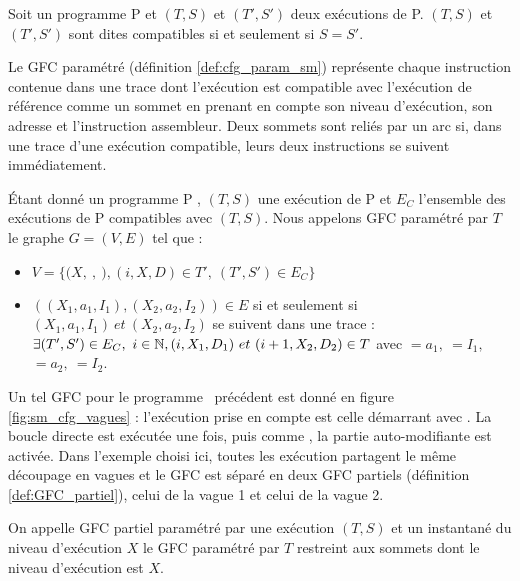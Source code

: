 \begin{defi}
 Soit un programme P et $(T, S)$ et $(T', S')$ deux exécutions de P.
 $(T, S)$ et $(T', S')$ sont dites compatibles si et seulement si $S=S'$.
\label{def:executions_compatibles}
\end{defi}

Le GFC paramétré (définition \ref{def:cfg_param_sm}) représente chaque instruction contenue dans une trace dont l'exécution est compatible avec l'exécution de référence comme un sommet en prenant en compte son niveau d'exécution, son adresse et l'instruction assembleur. Deux sommets sont reliés par un arc si, dans une trace d'une exécution compatible, leurs deux instructions se suivent immédiatement.

\begin{defi}
 Étant donné un programme P \sm, $(T, S)$ une exécution de P et $E_C$ l'ensemble des exécutions de P compatibles avec $(T, S)$.
 Nous appelons GFC paramétré par $T$ le graphe $G=(V, E)$ tel que :
 \begin{itemize}
  \item $V=\{(X,\ $$,\ $$), (i, X, D)\in T',\ (T', S')\in E_C \}$%
  \item $((X_1, a_1, I_1), (X_2, a_2, I_2))\in E$ si et seulement si $(X_1, a_1,
I_1)\ et\ (X_2, a_2, I_2)$ se suivent dans une trace : $\exists (T', S')\in
E_C,\ i\in \mathbb N, (i, X_1, D_1)\ et\ (i+1, X_2, D_2)\in T$ avec $=a_1,\ $$=I_1,$~$=a_2,\ $$=I_2$.
 \end{itemize}
\label{def:cfg_param_sm}
\end{defi}


Un tel GFC pour le programme \sm\ précédent est donné en figure \ref{fig:sm_cfg_vagues} : l'exécution prise en compte est celle démarrant avec . La boucle directe est exécutée une fois, puis comme , la partie auto-modifiante est activée. Dans l'exemple choisi ici, toutes les exécution partagent le même découpage en vagues et le GFC est séparé en deux GFC partiels (définition \ref{def:GFC_partiel}), celui de la vague 1 et celui de la vague 2.

\begin{defi}
 On appelle GFC partiel paramétré par une exécution $(T, S)$ et un instantané du niveau d'exécution $X$ le GFC paramétré par $T$ restreint aux sommets dont le niveau d'exécution est $X$.
\label{def:GFC_partiel}
\end{defi}


